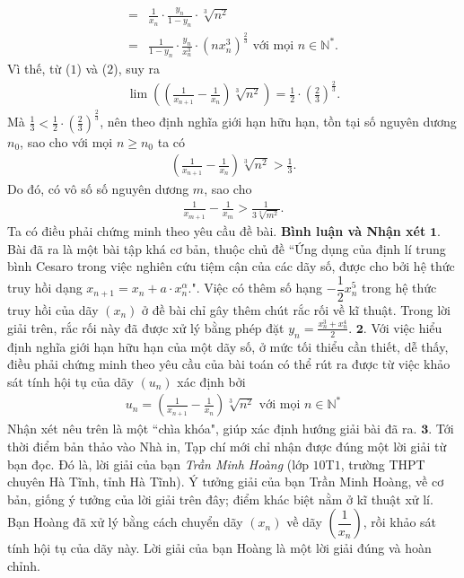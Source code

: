 \begin{multicols}{2}
\begin{align*}
		= &\frac{1}{{{x_n}}} \cdot \frac{{{y_n}}}{{1 - {y_n}}} \cdot \sqrt[3]{{{n^2}}} \\
		= &\frac{1}{{1 - {y_n}}} \cdot \frac{{{y_n}}}{{x_n^3}} \cdot {\left( {nx_n^3} \right)^{\frac{2}{3}}} \text{ với mọi } n\in \mathbb{N^*}.
	\end{align*}  
	Vì thế, từ ($1$) và ($2$), suy ra
	\begin{align*}
		\lim \left( {\left( {\frac{1}{{{x_{n + 1}}}} - \frac{1}{{{x_n}}}} \right)\sqrt[3]{{{n^2}}}} \right) = \frac{1}{2} \cdot {\left( {\frac{2}{3}} \right)^{\frac{2}{3}}}.
	\end{align*}
	Mà  $\frac{1}{3} < \frac{1}{2} \cdot {\left( {\frac{2}{3}} \right)^{\frac{2}{3}}}$, nên theo định nghĩa giới hạn hữu hạn, tồn tại số nguyên dương  $n_0$, sao cho với mọi $n \ge n_0$  ta có
	\begin{align*}
		\left( {\frac{1}{{{x_{n + 1}}}} - \frac{1}{{{x_n}}}} \right)\sqrt[3]{{{n^2}}} > \frac{1}{3}.
	\end{align*}
	Do đó, có vô số số nguyên dương $m$, sao cho
	\begin{align*}
		\frac{1}{{{x_{m + 1}}}} - \frac{1}{{{x_m}}} > \frac{1}{{3\sqrt[3]{{{m^2}}}}}.
	\end{align*}
	Ta có điều phải chứng minh theo yêu cầu đề bài.
	\vskip 0.05cm
	\textbf{\color{thachthuctoanhoc}Bình luận và Nhận xét}
	\vskip 0.05cm
	$\pmb{1.}$ Bài đã ra là một bài tập khá cơ bản, thuộc chủ đề ``Ứng dụng của định lí trung bình Cesaro trong việc nghiên cứu tiệm cận của các dãy số, được cho bởi hệ thức truy hồi dạng ${x_{n + 1}} = {x_n} + a \cdot x_n^\alpha .$". Việc có thêm số hạng $-\dfrac{1}{2}x_n^5$ trong hệ thức truy hồi của dãy $(x_n)$  ở đề bài chỉ gây thêm chút rắc rối về kĩ thuật. Trong lời giải trên, rắc rối này đã được xử lý bằng phép đặt  ${y_n} = \frac{{x_n^3 + x_n^4}}{2}$.
	\vskip 0.05cm
	$\pmb{2.}$ Với việc hiểu định nghĩa giới hạn hữu hạn của một dãy số, ở mức tối thiểu cần thiết, dễ thấy, điều phải chứng minh theo yêu cầu của bài toán có thể rút ra được từ việc khảo sát tính hội tụ của dãy $(u_n)$  xác định bởi
	\begin{align*}
		{u_n} = \left( {\frac{1}{{{x_{n + 1}}}} - \frac{1}{{{x_n}}}} \right)\sqrt[3]{{{n^2}}} \text{ với mọi } n \in \mathbb{N^*}
	\end{align*}
	Nhận xét nêu trên là một ``chìa khóa", giúp xác định hướng giải bài đã ra.
	\vskip 0.05cm
	$\pmb{3.}$ Tới thời điểm bản thảo vào Nhà in, Tạp chí mới chỉ nhận được đúng một lời giải từ bạn đọc. Đó là, lời giải của bạn \textit{Trần Minh Hoàng} (lớp $10$T$1$, trường THPT chuyên Hà Tĩnh, tỉnh Hà Tĩnh). Ý tưởng giải của bạn Trần Minh Hoàng, về cơ bản, giống ý tưởng của lời giải trên đây; điểm khác biệt nằm ở kĩ thuật xử lí. Bạn Hoàng đã xử lý bằng cách chuyển dãy $(x_n)$  về dãy  $\left(\dfrac{1}{x_n}\right)$, rồi khảo sát tính hội tụ của dãy này. Lời giải của bạn Hoàng là một lời giải đúng và hoàn chỉnh.

\end{multicols}
